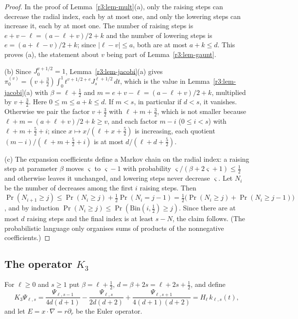 \documentclass[11pt]{amsart}
\theoremstyle{definition}
\theoremstyle{remark}
\numberwithin{equation}{section}
\begin{document}
\begin{proof}
In the proof of Lemma~\ref{r3:lem-mult}(a), only the raising steps can decrease the radial index, each by at most one, and only the lowering steps can increase it, each by at most one. The number of raising steps is $e+v-\ell=(a-\ell+v)/2+k$ and the number of lowering steps is $e=(a+\ell-v)/2+k$; since $|\ell-v|\leq a$, both are at most $a+k\leq d$. This proves (a), the statement about $v$ being part of Lemma~\ref{r3:lem-gaunt}.

(b) Since $J^{v+1/2}_0=1$, Lemma~\ref{r3:lem-jacobi}(a) gives $\pi^{(v)}_0=(v+\frac32)\int_0^1t^{v+1/2+e}J^{\ell+1/2}_s\,dt$, which is the value in Lemma~\ref{r3:lem-jacobi}(a) with $\beta=\ell+\frac12$ and $m=e+v-\ell=(a-\ell+v)/2+k$, multiplied by $v+\frac32$. Here $0\leq m\leq a+k\leq d$. If $m<s$, in particular if $d<s$, it vanishes. Otherwise we pair the factor $v+\frac32$ with $\ell+m+\frac32$, which is not smaller because $\ell+m=(a+\ell+v)/2+k\geq v$, and each factor $m-i$ ($0\leq i<s$) with $\ell+m+\frac52+i$; since $x\mapsto x/(\ell+x+\frac52)$ is increasing, each quotient $(m-i)/(\ell+m+\frac52+i)$ is at most $d/(\ell+d+\frac52)$.

(c) The expansion coefficients define a Markov chain on the radial index: a raising step at parameter $\beta$ moves $\varsigma$ to $\varsigma-1$ with probability $\varsigma/(\beta+2\varsigma+1)\leq\frac12$ and otherwise leaves it unchanged, and lowering steps never decrease $\varsigma$. Let $N_i$ be the number of decreases among the first $i$ raising steps. Then $\Pr(N_{i+1}\geq j)\leq\Pr(N_i\geq j)+\frac12\Pr(N_i=j-1)=\frac12\big(\Pr(N_i\geq j)+\Pr(N_i\geq j-1)\big)$, and by induction $\Pr(N_i\geq j)\leq\Pr(\mathrm{Bin}(i,\frac12)\geq j)$. Since there are at most $d$ raising steps and the final index is at least $s-N$, the claim follows. (The probabilistic language only organises sums of products of the nonnegative coefficients.)
\end{proof}

\subsection{\texorpdfstring{The operator $K_3$}{The operator K3}}\label{r3:sec-K}

For $\ell\geq0$ and $s\geq1$ put $\beta=\ell+\frac12$, $d=\beta+2s=\ell+2s+\frac12$, and define
\begin{equation}\label{r3:eq-K}
K_3\Psi_{\ell,s}=\frac{\Psi_{\ell,s-1}}{4d(d+1)}-\frac{\Psi_{\ell,s}}{2d(d+2)}+\frac{\Psi_{\ell,s+1}}{4(d+1)(d+2)}=H_\ell\,k_{\ell,s}(t),
\end{equation}
and let $E=x\cdot\nabla=r\partial_r$ be the Euler operator.
\end{document}
